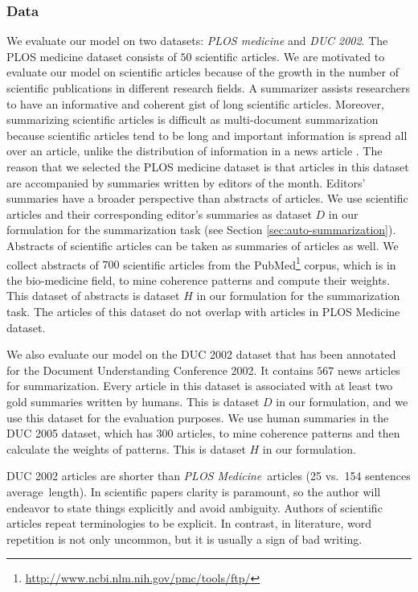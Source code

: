 \subsubsection{Data}
We evaluate our model on two datasets:  \emph{PLOS medicine} and \emph{DUC 2002}. 
The PLOS medicine dataset consists of $50$ scientific articles.  
We are motivated to evaluate our model on scientific articles because of the growth in the number of scientific publications in different research fields.  
A summarizer assists researchers to have an informative and coherent gist of long scientific articles. 
Moreover, summarizing scientific articles is difficult as multi-document summarization because scientific articles tend to be long and important information is spread all over an article,  unlike the distribution of information in a news article \cite{teufel02}. 
The reason that we selected the PLOS medicine dataset is that articles in this dataset are accompanied by summaries written by editors of the month. 
Editors' summaries have a broader perspective than abstracts of articles.  
We use scientific articles and their corresponding editor's summaries as dataset $D$ in our formulation for the summarization task (see Section \ref{sec:auto-summarization}). 
Abstracts of scientific articles can be taken as summaries of articles as well. 
We collect abstracts of $700$ scientific articles from the PubMed\footnote{\url{http://www.ncbi.nlm.nih.gov/pmc/tools/ftp/}} corpus, which is in the \mbox{bio-medicine} field, to mine coherence patterns and compute their weights. 
This dataset of abstracts is dataset $H$ in our formulation for the summarization task.  
The articles of this dataset do not overlap with articles in PLOS Medicine dataset. 

We also evaluate our model on the DUC 2002 dataset that has been annotated for the Document Understanding Conference 2002. 
It contains $567$ news articles for summarization. 
Every article in this dataset is associated with at least two gold summaries written by humans. 
This is dataset $D$ in our formulation, and we use this dataset for the evaluation purposes. 
We use human summaries in the DUC 2005 dataset, which has $300$ articles, to mine coherence patterns and then calculate the weights of patterns.  
This is dataset $H$ in our formulation. 

DUC 2002 articles are shorter than \emph{PLOS Medicine}\ articles (25 vs.\ 154 sentences average\ length). 
In scientific papers clarity is paramount, so the author will endeavor to state things explicitly and avoid ambiguity. 
Authors of scientific articles repeat terminologies to be explicit.     
In contrast, in literature, word repetition is not only uncommon, but it is usually a sign of bad writing. 

